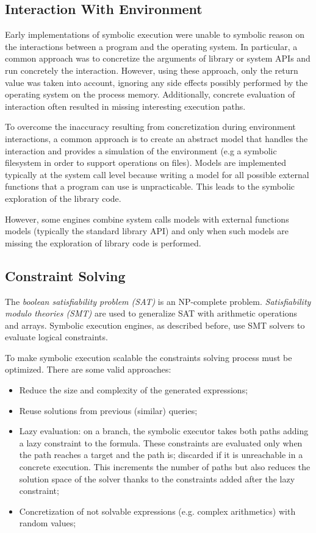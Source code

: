 \subsection{Interaction With Environment}

Early implementations of symbolic execution were unable to symbolic reason on the interactions between a program and the operating system. In particular, a common approach was to concretize the arguments of library or system APIs and run concretely the interaction. However, using these approach, only the return value was taken into account, ignoring any side effects possibly performed by the operating system on the process memory. Additionally, concrete evaluation of interaction often resulted in missing interesting execution paths.

To overcome the inaccuracy resulting from concretization during environment interactions, a common approach is to create an abstract model that handles the interaction and provides a simulation of the environment (e.g a symbolic filesystem in order to support operations on files).
Models are implemented typically at the system call level because writing a model for all possible external functions that a program can use is unpracticable.
This leads to the symbolic exploration of the library code.

However, some engines combine system calls models with external functions models (typically the standard library API) and only when such models are missing the exploration of library code is performed. 

\subsection{Constraint Solving}
\label{constr_solv}

The {\em boolean satisfiability problem (SAT)} is an NP-complete problem. {\em Satisfiability modulo theories (SMT)} are used to generalize SAT with arithmetic operations and arrays.
Symbolic execution engines, as described before, use SMT solvers to evaluate logical constraints.

To make symbolic execution scalable the constraints solving process must be optimized.
There are some valid approaches:

\begin{itemize}
\item Reduce the size and complexity of the generated expressions;
\item Reuse solutions from previous (similar) queries;
\item Lazy evaluation: on a branch, the symbolic executor takes both paths adding a lazy constraint to the formula. These constraints are evaluated only when the path reaches a target and the path is; discarded if it is unreachable in a concrete execution. This increments the number of paths but also reduces the solution space of the solver thanks to the constraints added after the lazy constraint;
\item Concretization of not solvable expressions (e.g. complex arithmetics) with random values;
\end{itemize}

